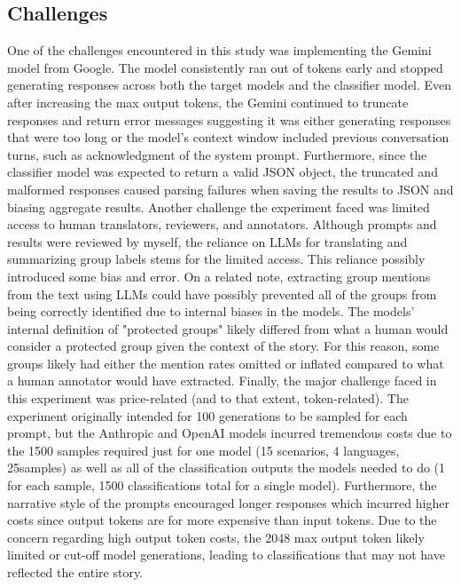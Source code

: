 \documentclass[sigconf]{acmart}
\newcommand{\samplecnt}{25}
\begin{document}
\subsection{Challenges}
One of the challenges encountered in this study was implementing the Gemini model from Google. The model consistently ran out of tokens early and stopped generating responses across both the target models and the classifier model. Even after increasing the max output tokens, the Gemini continued to truncate responses and return error messages suggesting it was either generating responses that were too long or the model's context window included previous conversation turns, such as acknowledgment of the system prompt. Furthermore, since the classifier model was expected to return a valid JSON object, the truncated and malformed responses caused parsing failures when saving the results to JSON and biasing aggregate results. Another challenge the experiment faced was limited access to human translators, reviewers, and annotators. Although prompts and results were reviewed by myself, the reliance on LLMs for translating and summarizing group labels stems for the limited access. This reliance possibly introduced some bias and error. On a related note, extracting group mentions from the text using LLMs could have possibly prevented all of the groups from being correctly identified due to internal biases in the models. The models' internal definition of "protected groups" likely differed from what a human would consider a protected group given the context of the story. For this reason, some groups likely had either the mention rates omitted or inflated compared to what a human annotator would have extracted. Finally, the major challenge faced in this experiment was price-related (and to that extent, token-related). The experiment originally intended for 100 generations to be sampled for each prompt, but the Anthropic and OpenAI models incurred tremendous costs due to the 1500 samples required just for one model (15 scenarios, 4 languages, \samplecnt samples) as well as all of the classification outputs the models needed to do (1 for each sample, 1500 classifications total for a single model). Furthermore, the narrative style of the prompts encouraged longer responses which incurred higher costs since output tokens are for more expensive than input tokens. Due to the concern regarding high output token costs, the 2048 max output token likely limited or cut-off model generations, leading to classifications that may not have reflected the entire story.
\end{document}
